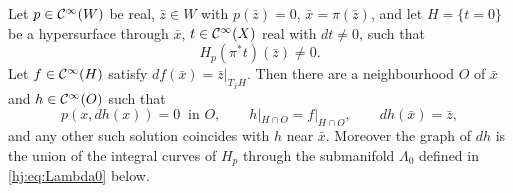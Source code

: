 \begin{theorem}\label{hj:thm:HJ}
  Let $p\in\mathcal{C}^\infty(W)$ be real, $\bar z\in W$ with $p(\bar z)=0$, $\bar x=\pi(\bar
  z)$, and let $H=\{t=0\}$ be a hypersurface through $\bar x$, $t\in\mathcal{C}^\infty(X)$ real
  with $dt\neq0$, such that
  \begin{equation}\label{hj:eq:transversal}
    H_p(\pi^*t)(\bar z)\neq0.
  \end{equation}
  Let $f\in\mathcal{C}^\infty(H)$ satisfy $df(\bar x)=\bar z|_{T_{\bar x}H}$.  Then there are a
  neighbourhood $O$ of $\bar x$ and $h\in\mathcal{C}^\infty(O)$ such that
  \begin{equation*}
    p(x,dh(x))=0\ \text{ in } O,\qquad h|_{H\cap O}=f|_{H\cap O},\qquad
    dh(\bar x)=\bar z,
  \end{equation*}
  and any other such solution coincides with $h$ near $\bar x$.  Moreover the
  graph of $dh$ is the union of the integral curves of $H_p$ through the
  submanifold $\Lambda_0$ defined in \eqref{hj:eq:Lambda0} below.
\end{theorem}
